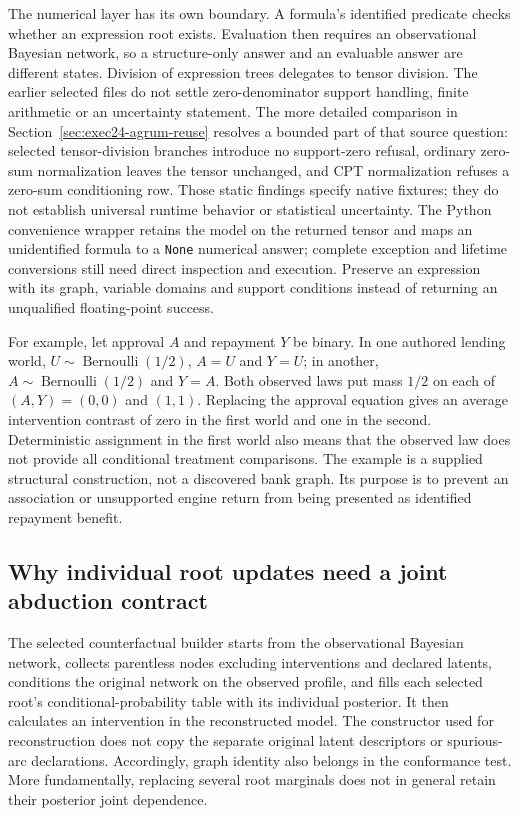 The numerical layer has its own boundary. A formula's identified predicate
checks whether an expression root exists. Evaluation then requires an
observational Bayesian network, so a structure-only answer and an evaluable
answer are different states. Division of expression trees delegates to tensor
division. The earlier selected files do not settle zero-denominator support
handling, finite arithmetic or an uncertainty statement. The more detailed
comparison in Section~\ref{sec:exec24-agrum-reuse} resolves a bounded part of
that source question: selected tensor-division branches introduce no support-zero
refusal, ordinary zero-sum normalization leaves the tensor unchanged, and CPT
normalization refuses a zero-sum conditioning row. Those static findings specify
native fixtures; they do not establish universal runtime behavior or statistical
uncertainty.\citep{exec24_agrum_source,exec24_agrum_choice}
The Python convenience wrapper
retains the model on the returned tensor and maps an unidentified formula to a
\texttt{None} numerical answer; complete exception and lifetime conversions
still need direct inspection and execution. Preserve an expression with its
graph, variable domains and support conditions instead of returning an
unqualified floating-point success.
\citep{exec19_cxx_identification_source}

For example, let approval $A$ and repayment $Y$ be binary. In one authored
lending world, $U\sim\operatorname{Bernoulli}(1/2)$, $A=U$ and $Y=U$;
in another, $A\sim\operatorname{Bernoulli}(1/2)$ and $Y=A$. Both observed laws
put mass $1/2$ on each of $(A,Y)=(0,0)$ and $(1,1)$. Replacing the approval
equation gives an average intervention contrast of zero in the first world
and one in the second. Deterministic assignment in the first world also means
that the observed law does not provide all conditional treatment comparisons.
The example is a supplied structural construction, not a discovered bank graph.
Its purpose is to prevent an association or unsupported engine return from
being presented as identified repayment benefit.
\citep{exec19_cxx_identification_reference}

\subsection{Why individual root updates need a joint abduction contract}
\label{exec19:cxxid-abduction}
The selected counterfactual builder starts from the observational Bayesian
network, collects parentless nodes excluding interventions and declared latents,
conditions the original network on the observed profile, and fills each selected
root's conditional-probability table with its individual posterior. It then
calculates an intervention in the reconstructed model. The constructor used
for reconstruction does not copy the separate original latent descriptors or
spurious-arc declarations. Accordingly, graph identity also belongs in the
conformance test. More fundamentally, replacing several root marginals does
not in general retain their posterior joint dependence.
\citep{exec19_cxx_identification_source}

